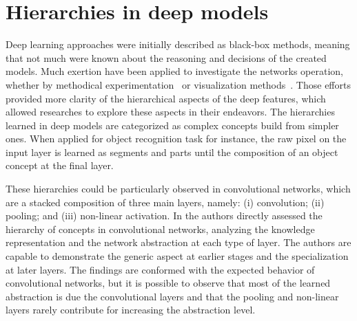 \section{Hierarchies in deep models}
\label{sec:deep-hier}

Deep learning approaches were initially described as black-box methods, meaning that not much were known about the reasoning and decisions of the created models. Much exertion have been applied to investigate the networks operation, whether by methodical experimentation~\cite{ilin17,kuo16,eigen14,zhang17} or visualization methods~\cite{simonyan13,zeiler14}. Those efforts provided more clarity of the hierarchical aspects of the deep features, which allowed researches to explore these aspects in their endeavors. The  hierarchies learned in deep models are categorized as complex concepts build from simpler ones. When applied for object recognition task for instance, the raw pixel on the input layer is learned as segments and parts until the composition of an object concept at the final layer.  

These hierarchies could be particularly observed in convolutional networks, which are a stacked composition of three main layers, namely: (i) convolution; (ii) pooling; and (iii) non-linear activation. In \cite{ilin17} the authors directly assessed the hierarchy of concepts in convolutional networks, analyzing the knowledge representation and the network abstraction at each type of layer.  The authors are capable to demonstrate the generic aspect at earlier stages and the specialization at later layers. The findings are conformed with the expected behavior of convolutional networks, but it is possible to observe that most of the learned abstraction is due the convolutional layers and that the pooling and non-linear layers rarely contribute for increasing  the abstraction level.

